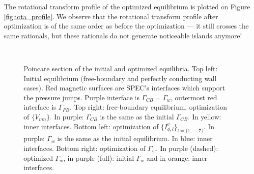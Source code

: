 \documentclass[my_thesis.tex]{subfiles}
\begin{document}

The rotational transform profile of the optimized equilibrium is plotted on Figure \ref{fig:iota_profile}. We observe that the rotational transform profile after optimization is of the same order as before the optimization --- it still crosses the same rationals, but these rationals do not generate noticeable islands anymore!

\begin{figure}
\centering
\hfill
{}
\hfill
{}
\hfill \\
\centering
\hfill
{}
\hfill
{}
\hfill
\caption{Poincare section of the initial and optimized equilibria. Top left: Initial equilibrium (free-boundary and perfectly conducting wall cases). Red magnetic surfaces are SPEC's interfaces which support the pressure jumps. Purple interface is $\Gamma_{CB}=\Gamma_w$, outermost red interface is $\Gamma_{PB}$. Top right: free-boundary equilibrium, optimization of $\{V_{mn}\}$. In purple: $\Gamma_{CB}$ is the same as the initial $\Gamma_{CB}$. In yellow:  inner interfaces. Bottom left: optimization of $\{I^v_{\phi,l}\}_{l=\{1,\ldots,7\}}$. In purple: $\Gamma_w$ is the same as the initial equilibrium. In blue: inner interfaces. Bottom right: optimization of $\Gamma_w$. In purple (dashed): optimized $\Gamma_w$, in purple (full): initial $\Gamma_w$ and in orange: inner interfaces.}
\label{fig:poincare_plots}
\end{figure}
\end{document}
